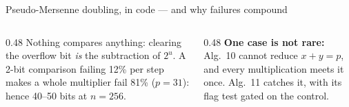 \documentclass[aspectratio=169,11pt]{beamer}
\newcommand{\code}[2][]{}
\begin{document}
\setcounter{framenumber}{83}
\begin{frame}[fragile]{Pseudo-Mersenne doubling, in code --- and why failures compound}
  \code[basicstyle=\ttfamily\fontsize{7.6}{8.8}\selectfont]{moddbl_pm.py}
  \begin{columns}[T]
    \begin{column}{0.48\textwidth}
      {\small Nothing compares anything: clearing the overflow bit \emph{is} the subtraction of $2^u$. A 2-bit comparison failing 12\% per step makes a whole multiplier fail 81\% ($p=31$): hence 40--50 bits at $n=256$.}
    \end{column}
    \begin{column}{0.48\textwidth}
      {\small \textbf{One case is not rare:} Alg.~10 cannot reduce $x+y=p$, and every multiplication meets it once. Alg.~11 catches it, with its flag test gated on the control.}
    \end{column}
  \end{columns}
\end{frame}
\end{document}
